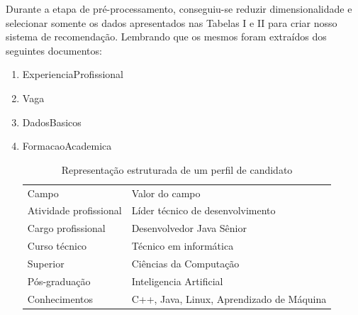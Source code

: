 \documentclass[conference]{IEEEtran}
\begin{document}
Durante a etapa de pré-processamento, conseguiu-se reduzir dimensionalidade e selecionar somente os dados apresentados nas Tabelas I e II para criar nosso sistema de recomendação. Lembrando que os mesmos foram extraídos dos seguintes documentos: 
\begin{enumerate}
\item ExperienciaProfissional
\item Vaga
\item DadosBasicos
\item FormacaoAcademica
								
\begin{table}[h]
 \centering
 {\renewcommand\arraystretch{1.25}
\caption{Representação estruturada de um perfil de candidato}
 \begin{tabular}{ l l }
  \cline{1-1}\cline{2-2}  
    \multicolumn{1}{|p{3.0cm}|}{\cellcolor{}Campo \centering } &
    \multicolumn{1}{p{4.217cm}|}{\cellcolor{}Valor do campo \centering }
  \\  
  \cline{1-1}\cline{2-2}  
    \multicolumn{1}{|p{3.0cm}|}{Atividade profissional } &
    \multicolumn{1}{p{4.217cm}|}{ Líder técnico de desenvolvimento}
  \\  
  \cline{1-1}\cline{2-2}  
    \multicolumn{1}{|p{3.0cm}|}{  Cargo profissional } &
    \multicolumn{1}{p{4.217cm}|}{ Desenvolvedor Java Sênior}
  \\  
  \cline{1-1}\cline{2-2}  
    \multicolumn{1}{|p{3.0cm}|}{  Curso técnico} &
    \multicolumn{1}{p{4.217cm}|}{Técnico em informática }
  \\  
  \cline{1-1}\cline{2-2}  
    \multicolumn{1}{|p{3.0cm}|}{  Superior} &
    \multicolumn{1}{p{4.217cm}|}{ Ciências da Computação }
  \\  
  \cline{1-1}\cline{2-2}  
    \multicolumn{1}{|p{3.0cm}|}{  Pós-graduação} &
    \multicolumn{1}{p{4.217cm}|}{ Inteligencia Artificial}
  \\  
  \cline{1-1}\cline{2-2}  
    \multicolumn{1}{|p{3.0cm}|}{  Conhecimentos } &
    \multicolumn{1}{p{4.217cm}|}{ C++, Java, Linux, Aprendizado de Máquina }
  \\  
  \hline
 \end{tabular} }
\end{table}


\end{enumerate}
\end{document}
